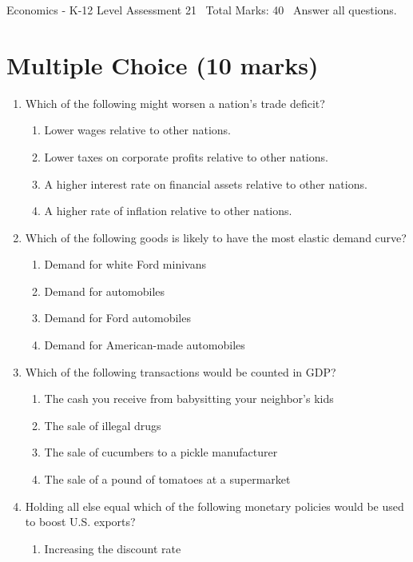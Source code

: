 \documentclass[12pt]{article}
\begin{document}
\begin{center}
Economics - K-12 Level Assessment 21 \
Total Marks: 40 \
Answer all questions.
\end{center}

\section*{Multiple Choice (10 marks)}
\begin{enumerate}[label=\arabic*.]
\item Which of the following might worsen a nation's trade deficit?
\begin{enumerate}[label=(\alph*)]
    \item Lower wages relative to other nations.
    \item Lower taxes on corporate profits relative to other nations.
    \item A higher interest rate on financial assets relative to other nations.
    \item A higher rate of inflation relative to other nations.
\end{enumerate}
\item Which of the following goods is likely to have the most elastic demand curve?
\begin{enumerate}[label=(\alph*)]
    \item Demand for white Ford minivans
    \item Demand for automobiles
    \item Demand for Ford automobiles
    \item Demand for American-made automobiles
\end{enumerate}
\item Which of the following transactions would be counted in GDP?
\begin{enumerate}[label=(\alph*)]
    \item The cash you receive from babysitting your neighbor's kids
    \item The sale of illegal drugs
    \item The sale of cucumbers to a pickle manufacturer
    \item The sale of a pound of tomatoes at a supermarket
\end{enumerate}
\item Holding all else equal which of the following monetary policies would be used to boost U.S. exports?
\begin{enumerate}[label=(\alph*)]
    \item Increasing the discount rate

\end{enumerate}
\end{enumerate}
\end{document}
